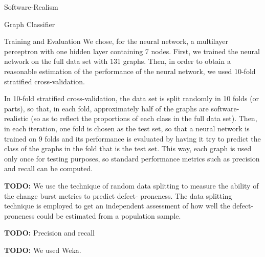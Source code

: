 \documentclass[11pt,twocolumn,a4paper,english]{article}
\newcommand{\TODO}{\textbf{TODO:} }
\begin{document}
\begin{section}{Software-Realism}
\begin{subsection}{Graph Classifier}
\begin{subsubsection}{Training and Evaluation}
	We chose, for the neural network, a multilayer perceptron with one hidden layer containing 7 nodes. First, we trained the neural network on the full data set with 131 graphs. Then, in order to obtain a reasonable estimation of the performance of the neural network, we used 10-fold stratified cross-validation.
	
	In 10-fold stratified cross-validation, the data set is split randomly in 10 folds (or parts), so that, in each fold, approximately half of the graphs are software-realistic (so as to reflect the proportions of each class in the full data set). Then, in each iteration, one fold is chosen as the test set, so that a neural network is trained on 9 folds and its performance is evaluated by having it try to predict the class of the graphs in the fold that is the test set. This way, each graph is used only once for testing purposes, so standard performance metrics such as precision and recall can be computed.
	
	\TODO We use the technique of random data splitting to measure the ability of the change burst metrics to predict defect- proneness. The data splitting technique is employed to get an independent assessment of how well the defect-proneness could be estimated from a population sample. 
	
	\TODO Precision and recall
	
	\TODO We used Weka.
	
	
	

\end{subsubsection}
\end{subsection}
\end{section}
\end{document}
